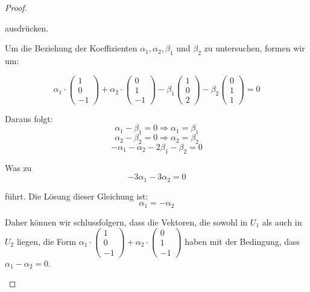 \documentclass{../problemset}
\begin{document}
\begin{problem}
\begin{proof}
\begin{enumerate}
		      ausdrücken.

		      Um die Beziehung der Koeffizienten \(\alpha_1, \alpha_2, \beta_1\) und \(\beta_2\) zu untersuchen, formen wir um:

		      \[
			      \alpha_1 \cdot \begin{pmatrix}
				      1 \\
				      0 \\
				      -1
			      \end{pmatrix} + \alpha_2 \cdot \begin{pmatrix}
				      0 \\
				      1 \\
				      -1
			      \end{pmatrix} - \beta_1 \begin{pmatrix}
				      1 \\ 0 \\ 2
			      \end{pmatrix} - \beta_2 \begin{pmatrix}
				      0 \\ 1 \\ 1
			      \end{pmatrix} = 0
		      \]

		      Daraus folgt:
		      \[
			      \alpha_1 - \beta_1 = 0 \Rightarrow \alpha_1 = \beta_1
		      \]
		      \[
			      \alpha_2 - \beta_2 = 0 \Rightarrow \alpha_2 = \beta_2
		      \]
		      \[
			      -\alpha_1 - \alpha_2 - 2\beta_1 - \beta_2 = 0
		      \]

		      Was zu
		      \[
			      -3\alpha_1 -3\alpha_2 = 0
		      \]

		      führt. Die Lösung dieser Gleichung ist:
		      \[
			      \alpha_1 = -\alpha_2
		      \]

		      Daher können wir schlussfolgern, dass die Vektoren, die sowohl in \(U_1\) als auch in \(U_2\) liegen, die Form \(\alpha_1 \cdot \begin{pmatrix}
			      1 \\
			      0 \\
			      -1
		      \end{pmatrix} + \alpha_2 \cdot \begin{pmatrix}
			      0 \\
			      1 \\
			      -1
		      \end{pmatrix}\) haben mit der Bedingung, dass \(\alpha_1 - \alpha_2 = 0\).
	\end{enumerate}
\end{proof}
\end{problem}
\end{document}
